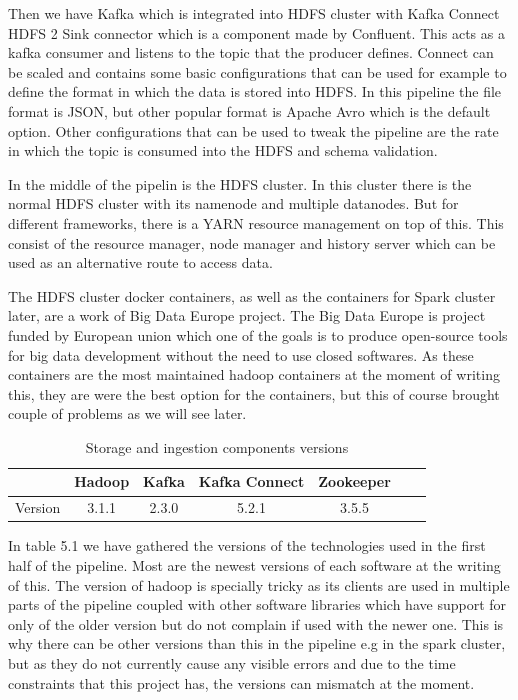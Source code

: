 Then we have Kafka which is integrated into HDFS cluster with Kafka Connect HDFS 2 Sink connector which is a component made by Confluent.
This acts as a kafka consumer and listens to the topic that the producer defines.
Connect can be scaled and contains some basic configurations that can be used for example to define the format in which the data is stored into HDFS.
In this pipeline the file format is JSON, but other popular format is Apache Avro which is the default option.
Other configurations that can be used to tweak the pipeline are the rate in which the topic is consumed into the HDFS and schema validation.

In the middle of the pipelin is the HDFS cluster.
In this cluster there is the normal HDFS cluster with its namenode and multiple datanodes.
But for different frameworks, there is a YARN resource management on top of this.
This consist of the resource manager, node manager and history server which can be used as an alternative route to access data.

The HDFS cluster docker containers, as well as the containers for Spark cluster later, are a work of Big Data Europe project.
The Big Data Europe is project funded by European union which one of the goals is to produce open-source tools for big data development without the need to use closed softwares.\cite{bigdataeurope}
As these containers are the most maintained hadoop containers at the moment of writing this, they are were the best option for the containers, but this of course brought couple of problems as we will see later.

\begin{table}[! htbp]\centering
    \caption{Storage and ingestion components versions}
    \begin{threeparttable}
        \begin{tabular}{|c|c|c|c|c|c|c|} 
        \hline
        & Hadoop & Kafka & Kafka Connect & Zookeeper \\ \hline
        Version & 3.1.1 & 2.3.0 & 5.2.1 & 3.5.5\\
        \hline
        \end{tabular}
    \end{threeparttable}
\end{table}

In table 5.1 we have gathered the versions of the technologies used in the first half of the pipeline.
Most are the newest versions of each software at the writing of this.
The version of hadoop is specially tricky as its clients are used in multiple parts of the pipeline coupled with other software libraries which have support for only of the older version but do not complain if used with the newer one.
This is why there can be other versions than this in the pipeline e.g in the spark cluster, but as they do not currently cause any visible errors and due to the time constraints that this project has, the versions can mismatch at the moment.

